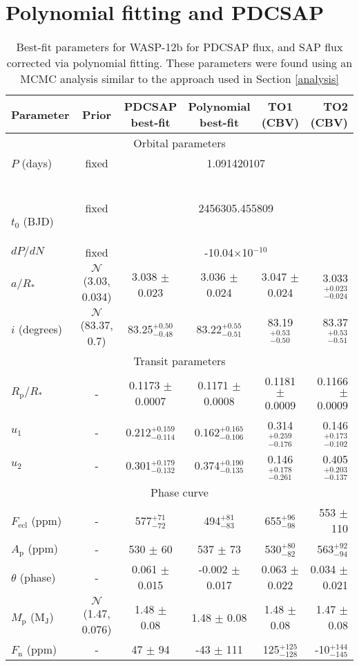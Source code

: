 \documentclass[fleqn,usenatbib]{mnras}
\begin{document}
\section{Polynomial fitting and PDCSAP}\label{app:1}
\begin{table*}
	\centering
	\caption{Best-fit parameters for WASP-12b for PDCSAP flux, and SAP flux corrected via polynomial fitting. These parameters were found using an MCMC analysis similar to the approach used in Section \ref{analysis}}
	\label{tab:poly}
	\begin{tabular}{lccccr}
		\hline\hline
		Parameter & Prior & PDCSAP best-fit & Polynomial best-fit & TO1 (CBV) & TO2 (CBV)\\
		\hline
		\multicolumn{6}{c}{Orbital parameters} \\
		\hline
		$P$ (days) & fixed & \multicolumn{4}{c}{1.091420107}\\\
		\rule{0pt}{3.5ex}$t_{\mathrm{0}}$ (BJD) & fixed & \multicolumn{4}{c}{2456305.455809}\\
		\rule{0pt}{3.5ex}$dP/dN$ & fixed & \multicolumn{4}{c}{-10.04$\times$10$^{-10}$}\\
		\rule{0pt}{3.5ex}$a/R_{*}$ & $\mathcal{N}$(3.03, 0.034) & 3.038 $\pm$ 0.023 & 3.036 $\pm$ 0.024 & 3.047 $\pm$ 0.024 & 3.033$^{+0.023}_{-0.024}$\\
		\rule{0pt}{3.5ex}$i$ (degrees) & $\mathcal{N}$(83.37, 0.7) & 83.25$^{+0.50}_{-0.48}$ & 83.22$^{+0.55}_{-0.51}$ & 83.19$^{+0.53}_{-0.50}$ & 83.37$^{+0.53}_{-0.51}$\\
		\hline
		\multicolumn{6}{c}{Transit parameters} \\
		\hline
		$R_{\mathrm{p}}/R_{*}$ & - & 0.1173 $\pm$ 0.0007 & 0.1171 $\pm$ 0.0008 & 0.1181 $\pm$ 0.0009 & 0.1166 $\pm$ 0.0009\\
	    \rule{0pt}{3.5ex}$u_{1}$ & - & 0.212$^{+0.159}_{-0.114}$ & 0.162$^{+0.165}_{-0.106}$ & 0.314$^{+0.259}_{-0.176}$ & 0.146$^{+0.173}_{-0.102}$\\
	    \rule{0pt}{3.5ex}$u_{2}$ & - & 0.301$^{+0.179}_{-0.132}$ & 0.374$^{+0.190}_{-0.135}$ & 0.146$^{+0.178}_{-0.261}$ & 0.405$^{+0.203}_{-0.137}$\\
	    \hline
	    \multicolumn{6}{c}{Phase curve} \\
	    \hline
	    $F_{\mathrm{ecl}}$ (ppm) & - & 577$^{+71}_{-72}$ & 494$^{+81}_{-83}$ & 655$^{+96}_{-98}$ & 553 $\pm$ 110\\
	    \rule{0pt}{3.5ex}$A_{\mathrm{p}}$ (ppm) & - & 530 $\pm$ 60 & 537 $\pm$ 73 & 530$^{+80}_{-82}$ & 563$^{+92}_{-94}$\\
	    \rule{0pt}{3.5ex}$\theta$ (phase) & - & 0.061 $\pm$ 0.015 & -0.002 $\pm$ 0.017 & 0.063 $\pm$ 0.022 & 0.034 $\pm$ 0.021\\
	    \rule{0pt}{3.5ex}$M_{\mathrm{p}}$ (M$_{\mathrm{J}}$) & $\mathcal{N}$(1.47, 0.076) & 1.48 $\pm$ 0.08 & 1.48 $\pm$ 0.08 & 1.48 $\pm$ 0.08 & 1.47 $\pm$ 0.08\\
	    \rule{0pt}{3.5ex}$F_{\mathrm{n}}$ (ppm) & - & 47 $\pm$ 94 & -43 $\pm$ 111 & 125$^{+125}_{-128}$ & -10$^{+144}_{-145}$\\
		\hline
	\end{tabular}
\end{table*}
\end{document}

